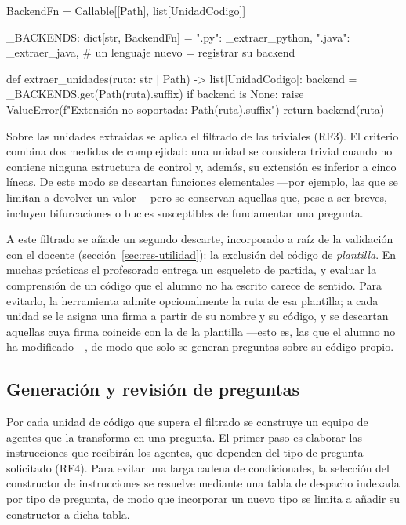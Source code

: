 \begin{pythoncode}[title={parser.py --- registro de analizadores por lenguaje}, list entry={\protect\numberline{\thelisting}Registro de analizadores por lenguaje}]
BackendFn = Callable[[Path], list[UnidadCodigo]]

_BACKENDS: dict[str, BackendFn] = {
    ".py": _extraer_python,
    ".java": _extraer_java,    # un lenguaje nuevo = registrar su backend
}

def extraer_unidades(ruta: str | Path) -> list[UnidadCodigo]:
    backend = _BACKENDS.get(Path(ruta).suffix)
    if backend is None:
        raise ValueError(f"Extensión no soportada: {Path(ruta).suffix}")
    return backend(ruta)
\end{pythoncode}

Sobre las unidades extraídas se aplica el filtrado de las triviales (RF3).
El criterio combina dos medidas de complejidad: una unidad se considera
trivial cuando no contiene ninguna estructura de control y, además, su
extensión es inferior a cinco líneas. De este modo se descartan funciones
elementales ---por ejemplo, las que se limitan a devolver un valor--- pero
se conservan aquellas que, pese a ser breves, incluyen bifurcaciones o
bucles susceptibles de fundamentar una pregunta.

A este filtrado se añade un segundo descarte, incorporado a raíz de la
validación con el docente (sección~\ref{sec:res-utilidad}): la exclusión del
código de \emph{plantilla}. En muchas prácticas el profesorado entrega un
esqueleto de partida, y evaluar la comprensión de un código que el alumno no ha
escrito carece de sentido. Para evitarlo, la herramienta admite opcionalmente
la ruta de esa plantilla; a cada unidad se le asigna una firma a partir de su
nombre y su código, y se descartan aquellas cuya firma coincide con la de la
plantilla ---esto es, las que el alumno no ha modificado---, de modo que solo se
generan preguntas sobre su código propio.

\subsection{Generación y revisión de preguntas}
\label{sec:impl-agentes}

Por cada unidad de código que supera el filtrado se construye un equipo de
agentes que la transforma en una pregunta. El primer paso es elaborar las
instrucciones que recibirán los agentes, que dependen del tipo de pregunta
solicitado (RF4). Para evitar una larga cadena de condicionales, la
selección del constructor de instrucciones se resuelve mediante una tabla
de despacho indexada por tipo de pregunta, de modo que incorporar un nuevo
tipo se limita a añadir su constructor a dicha tabla.

